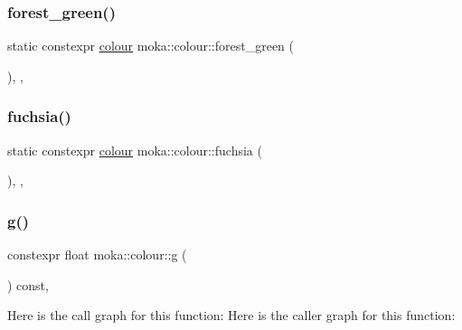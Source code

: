 \subsubsection{\texorpdfstring{forest\_green()}{forest\_green()}}
{\footnotesize\ttfamily static constexpr \mbox{\hyperlink{classmoka_1_1colour}{colour}} moka\+::colour\+::forest\+\_\+green (\begin{DoxyParamCaption}{ }\end{DoxyParamCaption})\hspace{0.3cm}{\ttfamily [inline]}, {\ttfamily [static]}, {\ttfamily [noexcept]}}

\mbox{\label{classmoka_1_1colour_ac20a5ec45c83c8bbc89fdec5fcb3fc29}} 
\subsubsection{\texorpdfstring{fuchsia()}{fuchsia()}}
{\footnotesize\ttfamily static constexpr \mbox{\hyperlink{classmoka_1_1colour}{colour}} moka\+::colour\+::fuchsia (\begin{DoxyParamCaption}{ }\end{DoxyParamCaption})\hspace{0.3cm}{\ttfamily [inline]}, {\ttfamily [static]}, {\ttfamily [noexcept]}}

\mbox{\label{classmoka_1_1colour_a884fe789032a1e3a1d40c55f5cf852bd}} 
\subsubsection{\texorpdfstring{g()}{g()}}
{\footnotesize\ttfamily constexpr float moka\+::colour\+::g (\begin{DoxyParamCaption}{ }\end{DoxyParamCaption}) const\hspace{0.3cm}{\ttfamily [inline]}, {\ttfamily [noexcept]}}

Here is the call graph for this function\+:
Here is the caller graph for this function\+:
\mbox{\label{classmoka_1_1colour_a7c5975a37f7aa5bbbdfc4abc78002552}} 
